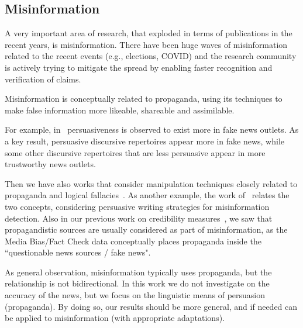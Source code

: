 \subsection{Misinformation}
\label{sec:lit_related_misinformation}

A very important area of research, that exploded in terms of publications in the recent years, is misinformation.
There have been huge waves of misinformation related to the recent events (e.g., elections, COVID) and the research community is actively trying to mitigate the spread by enabling faster recognition and verification of claims.

Misinformation is conceptually related to propaganda, using its techniques to make false information more likeable, shareable and assimilable.


For example, in~\citet{orrumachine} persuasiveness is observed to exist more in fake news outlets. As a key result, persuasive discursive repertoires appear more in fake news, while some other discursive repertoires that are less persuasive appear in more trustworthy news outlets.

Then we have also works that consider manipulation techniques closely related to propaganda and logical fallacies~\citep{roozenbeek2022countering}.
As another example, the work of~\citet{romain2022misinformation} relates the two concepts, considering persuasive writing strategies for misinformation detection.
Also in our previous work on credibility measures~\citep{mensio2019news}, %
we saw that propagandistic sources are usually considered as part of misinformation, as the Media Bias/Fact Check data conceptually places propaganda inside the ``questionable news sources / fake news".


As general observation, misinformation typically uses propaganda, but the relationship is not bidirectional. In this work we do not investigate on the accuracy of the news, but we focus on the linguistic means of persuasion (propaganda).
By doing so, our results should be more general, and if needed can be applied to misinformation (with appropriate adaptations). 

